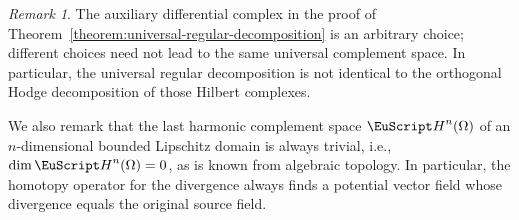 \documentclass[10pt,a4paper]{amsart}
\theoremstyle{definition}
\theoremstyle{remark}
\newtheorem{remark}[theorem]{Remark}
\numberwithin{equation}{section}
\newcommand{\euH}{{\EuScript H}}
\newcommand{\Domain}{{\Omega}}
\newcommand{\Harmonic}{{\euH}}
\begin{document}
    
        













\begin{remark}
    The auxiliary differential complex in the proof of Theorem~\ref{theorem:universal-regular-decomposition} is an arbitrary choice; different choices need not lead to the same universal complement space. In particular, the universal regular decomposition is not identical to the orthogonal Hodge decomposition of those Hilbert complexes. 
    
    We also remark that the last harmonic complement space $\Harmonic^{n}(\Domain)$ of an $n$-dimensional bounded Lipschitz domain is always trivial,
    i.e., $\dim \Harmonic^{n}(\Domain) = 0$, as is known from algebraic topology. 
    In particular, the homotopy operator for the divergence always finds a potential vector field whose divergence equals the original source field. 
\end{remark}
\end{document}
